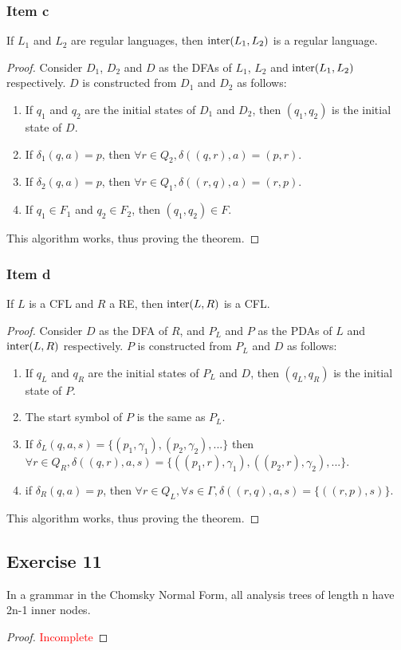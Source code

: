 \documentclass[docid=TP10]{tcom_TP}
\begin{document}
{\subsubsection{Item c}
\begin{theorem}
	If $L_1$ and $L_2$ are regular languages, then $\operatorname{inter}(L_1,L_2)$ is a regular language.
\end{theorem}
\begin{proof}
Consider $D_1$, $D_2$ and $D$ as the DFAs of $L_1$, $L_2$ and $\operatorname{inter}(L_1,L_2)$ respectively. $D$ is constructed from $D_1$ and $D_2$ as follows:
\begin{enumerate}
	\item If $q_1$ and $q_2$ are the initial states of $D_1$ and $D_2$, then $(q_1,q_2)$ is the initial state of $D$.
	\item If $\delta_1(q,a)=p$, then $\forall r \in Q_2, \delta((q,r),a)=(p,r)$.
	\item If $\delta_2(q,a)=p$, then $\forall r \in Q_1, \delta((r,q),a)=(r,p)$.
	\item If $q_1\in F_1$ and $q_2 \in F_2$, then $(q_1,q_2) \in F$.
\end{enumerate}
This algorithm works, thus proving the theorem.
\end{proof}
\subsubsection{Item d}
\begin{theorem}
	If $L$ is a CFL and $R$ a RE, then $\operatorname{inter}(L,R)$ is a CFL.
\end{theorem}
\begin{proof}
Consider $D$ as the DFA of $R$, and $P_L$ and $P$ as the PDAs of $L$ and $\operatorname{inter}(L,R)$ respectively. $P$ is constructed from $P_L$ and $D$ as follows:
\begin{enumerate}
	\item If $q_L$ and $q_R$ are the initial states of $P_L$ and $D$, then $(q_L, q_R)$ is the initial state of $P$.
	\item The start symbol of $P$ is the same as $P_L$.
	\item If $\delta_L(q,a,s)=\{(p_1,\gamma_1),(p_2,\gamma_2),...\}$ then $\forall r \in Q_R, \delta((q,r),a,s)=\{((p_1,r),\gamma_1),((p_2,r),\gamma_2),...\}$.
	\item if $\delta_R(q,a)=p$, then $\forall r \in Q_L, \forall s \in \Gamma, \delta((r,q),a,s)=\{((r,p),s)\}$.
\end{enumerate}
This algorithm works, thus proving the theorem.
\end{proof}
\subsection{Exercise 11}
\begin{theorem}
In a grammar in the Chomsky Normal Form, all analysis trees of length n have 2n-1 inner nodes.
\end{theorem}
\begin{proof}
\textcolor{red}{Incomplete}
\end{proof}
}
\end{document}
